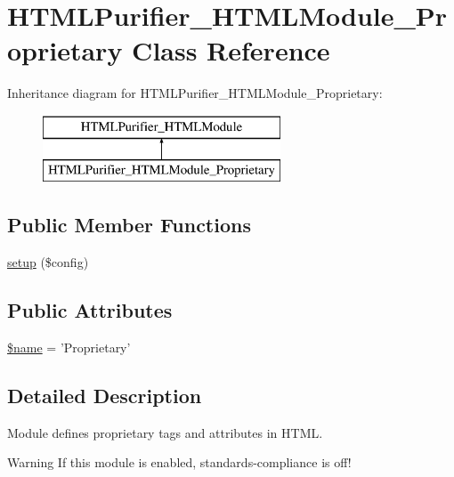 \hypertarget{classHTMLPurifier__HTMLModule__Proprietary}{\section{H\+T\+M\+L\+Purifier\+\_\+\+H\+T\+M\+L\+Module\+\_\+\+Proprietary Class Reference}
\label{classHTMLPurifier__HTMLModule__Proprietary}
}
Inheritance diagram for H\+T\+M\+L\+Purifier\+\_\+\+H\+T\+M\+L\+Module\+\_\+\+Proprietary\+:\begin{figure}[H]
\begin{center}
\leavevmode
\includegraphics[height=2.000000cm]{classHTMLPurifier__HTMLModule__Proprietary}
\end{center}
\end{figure}
\subsection*{Public Member Functions}
\begin{DoxyCompactItemize}
\item 
\hyperlink{classHTMLPurifier__HTMLModule__Proprietary_a1bbb8b8ee3f85523468a67fe2b76e35f}{setup} (\$config)
\end{DoxyCompactItemize}
\subsection*{Public Attributes}
\begin{DoxyCompactItemize}
\item 
\hyperlink{classHTMLPurifier__HTMLModule__Proprietary_a0e6c30a7cde3d5cf83ebcc14d4327446}{\$name} = 'Proprietary'
\end{DoxyCompactItemize}


\subsection{Detailed Description}
Module defines proprietary tags and attributes in H\+T\+M\+L. \begin{DoxyWarning}{Warning}
If this module is enabled, standards-\/compliance is off! 
\end{DoxyWarning}


